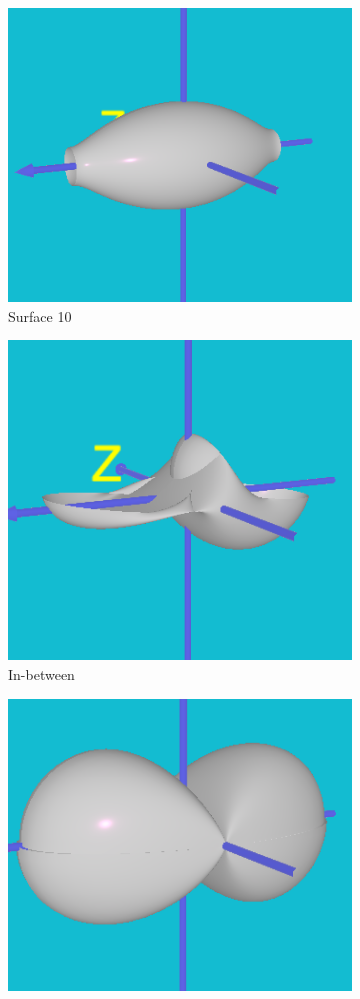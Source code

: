 \documentclass[acmlarge,nonacm=true]{acmart}
\begin{document}
\begin{figure}[H]
	\begin{subfigure}{.33\textwidth}
	  \centering
	  \includegraphics[width=.8\linewidth]{fig/3b_start}
	  \caption{Surface 10}
	\end{subfigure}%
	\begin{subfigure}{.33\textwidth}
	  \centering
	  \includegraphics[width=.8\linewidth]{fig/3b_mid}
	  \caption{In-between}
	\end{subfigure}
	\begin{subfigure}{.33\textwidth}
		\centering
		\includegraphics[width=.8\linewidth]{fig/3b_end}

\end{subfigure}
\end{figure}
\end{document}
